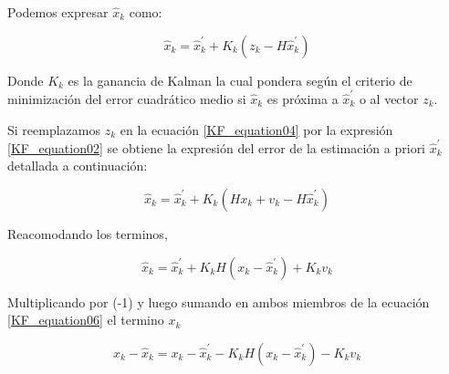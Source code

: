 \documentclass[10pt,a4paper]{article}
\begin{document}
	
	
	
	
	
	\clearpage
	
	Podemos expresar $\hat{x}_k$ como: 
	
	\begin{figure}[h!]
		\begin{center}
			\begin{equation}
				\hat{x}_k = \hat{x}^\prime_k + K_k (z_k - H\hat{x}^\prime_k)
				\label{KF_equation04}
			\end{equation}	
		\end{center}
	\end{figure}
	
	Donde $K_k$ es la ganancia de Kalman la cual pondera según el criterio de minimización del error cuadrático medio si $\hat{x}_k$ es próxima a $\hat{x}^\prime_k$ o al vector $z_k$.
	
	Si reemplazamos $z_k$ en la ecuación \ref{KF_equation04} por la expresión \ref{KF_equation02} se obtiene la expresión del error de la estimación a priori $\hat{x}^\prime_k$ detallada a continuación:
	
	\begin{figure}[h!]
		\begin{center}
			\begin{equation}
				\hat{x}_k = \hat{x}^\prime_k + K_k (Hx_{k} + v_{k} - H\hat{x}^\prime_k)
				\label{KF_equation05}
			\end{equation}	
		\end{center}
	\end{figure}
	
	Reacomodando los terminos, 
	
	\begin{figure}[h!]
		\begin{center}
			\begin{equation}
				\hat{x}_k = \hat{x}^\prime_k + K_k H (x_{k}  - \hat{x}^\prime_k) + K_kv_{k}
				\label{KF_equation06}
			\end{equation}	
		\end{center}
	\end{figure}
	
	Multiplicando por (-1) y luego sumando en ambos miembros de la ecuación \ref{KF_equation06} el termino $x_k$ 
	
	\begin{figure}[h!]
		\begin{center}
			\begin{equation}
				x_k - \hat{x}_k = x_{k} -\hat{x}^\prime_k - K_k H (x_{k}  - \hat{x}^\prime_k) - K_kv_{k}
				\label{KF_equation08}
			\end{equation}	
		\end{center}
	\end{figure}
	
\end{document}
